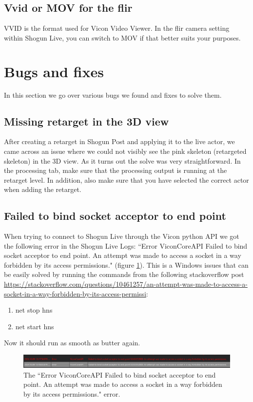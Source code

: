 \documentclass{uva-inf-article}
\begin{document}
\subsection{Vvid or MOV for the flir}
VVID is the format used for Vicon Video Viewer. In the flir camera setting within Shogun Live, you can switch to MOV if that better suits your purposes.


\section{Bugs and fixes}
In this section we go over various bugs we found and fixes to solve them.

\subsection{Missing retarget in the 3D view}
After creating a retarget in Shogun Post and applying it to the live actor, we came across an issue where we could not visibly see the pink skeleton (retargeted skeleton) in the 3D view. As it turns out the solve was very straightforward. In the processing tab, make sure that the processing output is running at the retarget level.
In addition, also make sure that you have selected the correct actor when adding the retarget.

\subsection{Failed to bind socket acceptor to end point}
When trying to connect to Shogun Live through the Vicon python API we got the following error in the Shogun Live Logs: ``Error ViconCoreAPI Failed to bind socket acceptor to end point. An attempt was made to access a socket in a way forbidden by its access permissions." (figure \ref{fig:socketError}).
This is a Windows issues that can be easily solved by running the commands from the following stackoverflow post \url{https://stackoverflow.com/questions/10461257/an-attempt-was-made-to-access-a-socket-in-a-way-forbidden-by-its-access-permissi}:
\begin{enumerate}
    \item net stop hns
    \item net start hns
\end{enumerate}
Now it should run as smooth as butter again.
\begin{figure}[hbt!]
    \centering
    \includegraphics[width=.9\textwidth]{imgs/socketError.png}
    \caption{The ``Error ViconCoreAPI Failed to bind socket acceptor to end point. An attempt was made to access a socket in a way forbidden by its access permissions." error.}
    \label{fig:socketError}
\end{figure}
\end{document}
